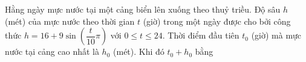 \begin{bt}%

	Hằng ngày mực nước tại một cảng biển lên xuống theo thuỷ triều. Độ sâu $h$ (mét) của mực nước theo thời gian $t$ (giờ) trong một ngày được cho bởi công thức $h=16 + 9\sin\left( \dfrac{t}{10}\pi \right)$ với $0\leq t\leq 24$. Thời điểm đầu tiên $t_0$ (giờ) mà mực nước tại cảng cao nhất là $h_0$ (mét). Khi đó $t_0 + h_0$ bằng
\end{bt}

